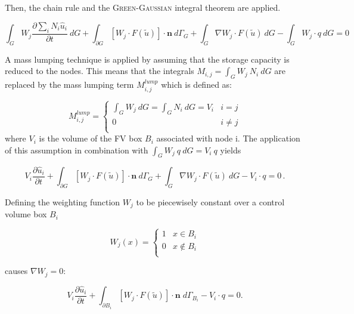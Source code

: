 Then, the chain rule and the \textsc{Green-Gaussian} integral theorem are applied.

\begin{equation}
	\int_G W_j \frac{\partial \sum_i N_i \hat u_i}{\partial t} \: dG + \int_{\partial G}  \left[ W_j \cdot F(\tilde u)\right]  \cdot \mathbf n \: d\varGamma_G + \int_G  \nabla W_j \cdot F(\tilde u)  \: dG - \int_G W_j \cdot q \: dG = 0
\end{equation}

A mass lumping technique is applied by assuming that the storage capacity is reduced to the nodes. This means that the integrals $M_{i,j} = \int_G W_j \: N_i \: dG$ are replaced by the mass lumping term $M^{lump}_{i,j}$ which is defined as:

\begin{equation}
	 M^{lump}_{i,j} =\begin{cases} \int_G W_j \: dG = \int_G N_i \: dG = V_i &i = j\\
	0 &i \neq j\\
	         \end{cases}
\end{equation}
where $V_i$ is the volume of the FV box $B_i$ associated with node i. The application of this assumption in combination with $\int_G W_j \:q \: dG = V_i \: q$ yields

\begin{equation}
	V_i \frac{\partial \hat u_i}{\partial t} + \int_{\partial G}  \left[ W_j \cdot F(\tilde u)\right]  \cdot \mathbf n \: d\varGamma_G + \int_G  \nabla W_j \cdot F(\tilde u)  \: dG- V_i \cdot q = 0 \, .
\end{equation}

Defining the weighting function $W_j$ to be piecewisely constant over a control volume box $B_i$ 

\begin{equation}
	W_j(x) = \begin{cases}
	          1 &x \in B_i \\
		  0 &x \notin B_i\\
	         \end{cases}
\end{equation}

causes $\nabla W_j = 0$:

\begin{equation}
\label{eq:disc1} 
	V_i \frac{\partial \hat u_i}{\partial t} + \int_{\partial B_i}  \left[ W_j \cdot F(\tilde u)\right] \cdot \mathbf n  \;  d{\varGamma}_{B_i} - V_i \cdot q = 0 .
\end{equation}

